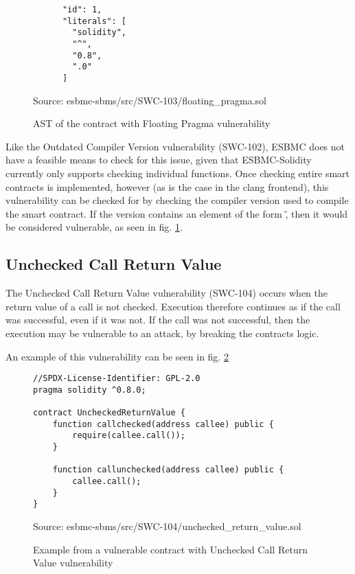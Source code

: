 \begin{figure}
\begin{lstlisting}
      "id": 1,
      "literals": [
        "solidity",
        "^",
        "0.8",
        ".0"
      ]
\end{lstlisting}
\caption{AST of the contract with Floating Pragma vulnerability}
Source: esbmc-sbms/src/SWC-103/floating\_pragma.sol
\label{fig:floating_pragma_ast}
\end{figure}

Like the Outdated Compiler Version vulnerability (SWC-102), ESBMC does not have a feasible means to check for this issue, given that ESBMC-Solidity currently only supports checking individual functions. Once checking entire smart contracts is implemented, however (as is the case in the clang frontend), this vulnerability can be checked for by checking the compiler version used to compile the smart contract. If the version contains an element of the form \^, then it would be considered vulnerable, as seen in fig. \ref{fig:floating_pragma_ast}. 

\subsection{Unchecked Call Return Value}
\label{sec:unchecked_call_return_value}

The Unchecked Call Return Value vulnerability (SWC-104) occurs when the return value of a call is not checked. Execution therefore continues as if the call was successful, even if it was not. If the call was not successful, then the execution may be vulnerable to an attack, by breaking the contracts logic.

An example of this vulnerability can be seen in fig. \ref{fig:unchecked_return_value}

\begin{figure}
\begin{lstlisting}
//SPDX-License-Identifier: GPL-2.0
pragma solidity ^0.8.0;

contract UncheckedReturnValue {
    function callchecked(address callee) public {
        require(callee.call());
    }

    function callunchecked(address callee) public {
        callee.call();
    }
}
\end{lstlisting}
\caption{Example from a vulnerable contract with Unchecked Call Return Value vulnerability }
Source: esbmc-sbms/src/SWC-104/unchecked\_return\_value.sol
\label{fig:unchecked_return_value}
\end{figure}

